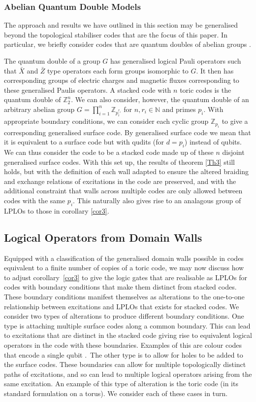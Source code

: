 \documentclass[pra,twocolumn,a4paper,nofootinbib]{revtex4-1}
\begin{document}
\subsubsection{Abelian Quantum Double Models}
The approach and results we have outlined in this section may be generalised beyond the topological stabiliser codes that are the focus of this paper. In particular, we briefly consider codes that are quantum doubles of abelian groups \cite{KitaevA,YoshidaC}. 

The quantum double of a group $G$ has generalised logical Pauli operators such that $\bar{X}$ and $\bar{Z}$ type operators each form groups isomorphic to $G$. It then has corresponding groups of electric charges and magnetic fluxes corresponding to these generalised Paulis operators. A stacked code with $n$ toric codes is the quantum double of $\mathbb{Z}_2^n$. We can also consider, however, the quantum double of an arbitrary abelian group $G=\prod_{i=1}^n \mathbb{Z}_{p_i^{r_i}}$ for $n,r_i \in \mathbb{N}$ and primes $p_i$. With appropriate boundary conditions, we can consider each cyclic group $\mathbb{Z}_{p_i}$ to give a corresponding generalised surface code. By generalised surface code we mean that it is equivalent to a surface code but with qudits (for $d=p_i$) instead of qubits. We can thus consider the code to be a stacked code made up of these $n$ disjoint generalised surface codes. With this set up, the results of theorem \ref{Th3} still holds, but with the definition of each wall adapted to ensure the altered braiding and exchange relations of excitations in the code are preserved, and with the additional constraint that walls across multiple codes are only allowed between codes with the same $p_i$. This naturally also gives rise to an analagous group of LPLOs to those in corollary \ref{cor3}.

\subsection{Logical Operators from Domain Walls}
\label{VC}
Equipped with a classification of the generalised domain walls possible in codes equivalent to a finite number of copies of a toric code, we may now discuss how to adjust corollary~\ref{cor3} to give the logic gates that are realisable as LPLOs for codes with boundary conditions that make them distinct from stacked codes. These boundary conditions manifest themselves as alterations to the one-to-one relationship between excitations and LPLOs that exists for stacked codes. We consider two types of alterations to produce different boundary conditions. One type is attaching multiple surface codes along a common boundary.  This can lead to excitations that are distinct in the stacked code giving rise to equivalent logical operators in the code with these boundaries. Examples of this are colour codes that encode a single qubit \cite{Kubica}.~The other type is to allow for holes to be added to the surface codes. These boundaries can allow for multiple topologically distinct paths of excitations, and so can lead to multiple logical operators arising from the same excitation. An example of this type of alteration is the toric code (in its standard formulation on a torus). We consider each of these cases in turn.
\end{document}
